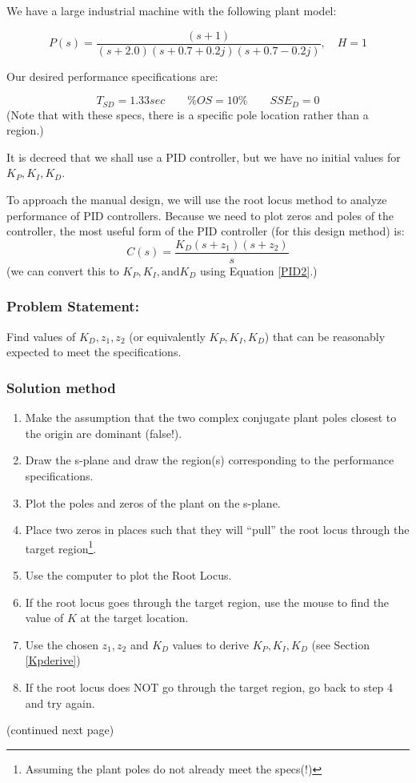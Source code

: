 \begin{Example}\label{ExampLargeIndustrialPlant}
We have a large industrial machine with the following plant model:

\[
P(s) = \frac {(s+1)} {(s+2.0)(s+0.7+0.2j)(s+0.7-0.2j)}, \quad H=1
\]


Our desired performance specifications are:

\[
T_{SD} = 1.33 sec  \qquad
\%OS = 10\%        \qquad
SSE_D = 0
\]
(Note that with these specs, there is a specific pole location rather than a region.)

It is decreed that we shall use a PID controller, but we have no initial values for $K_P, K_I, K_D$.

To approach the manual design, we will use the root locus method to analyze performance of PID controllers.  Because we need to plot zeros and poles of the controller,  the most useful form of the PID controller (for this design method) is:
\[
C(s) = \frac{K_D(s+z_1)(s+z_2)}{s}
\]
(we can convert this to $K_P, K_I, \mathrm{and} K_D$ using Equation \ref{PID2}.)

\subsubsection*{Problem Statement: }  Find values of $K_D, z_1, z_2$ (or equivalently $K_P, K_I, K_D$) that can be reasonably expected to meet the specifications.

\subsubsection*{Solution method}
\begin{enumerate}
 \item Make the assumption that the two complex conjugate plant poles closest to the origin are dominant (false!).
 \item Draw the s-plane and draw the region(s) corresponding to the performance specifications.
 \item Plot the poles and zeros of the plant on the s-plane.
 \item Place two zeros in places such that they will ``pull'' the root locus through the target region\footnote{Assuming the plant poles do not already meet the specs(!)}.

  \item Use the computer to plot the Root Locus.
  \item If the root locus goes through the target region, use the mouse to find the value of $K$ at the target location.
  \item Use the chosen $z_1, z_2$ and $K_D$ values to derive  $K_P, K_I, K_D$ (see Section \ref{Kpderive})
  \item If the root locus does NOT go through the target region, go back to step 4 and try again.
\end{enumerate}
%
(continued next page)
\end{Example}
%



